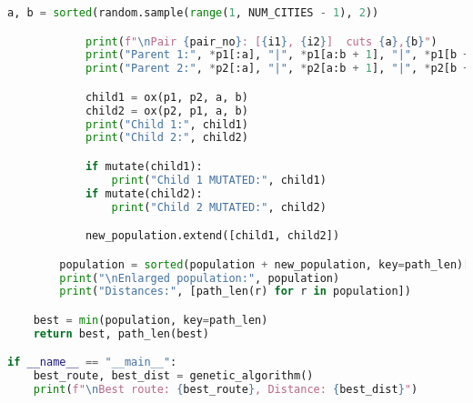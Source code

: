 \documentclass[a4paper,12pt]{article}
\begin{document}
\begin{lstlisting}[language=Python]
            a, b = sorted(random.sample(range(1, NUM_CITIES - 1), 2))

            print(f"\nPair {pair_no}: [{i1}, {i2}]  cuts {a},{b}")
            print("Parent 1:", *p1[:a], "|", *p1[a:b + 1], "|", *p1[b + 1:])
            print("Parent 2:", *p2[:a], "|", *p2[a:b + 1], "|", *p2[b + 1:])

            child1 = ox(p1, p2, a, b)
            child2 = ox(p2, p1, a, b)
            print("Child 1:", child1)
            print("Child 2:", child2)

            if mutate(child1):
                print("Child 1 MUTATED:", child1)
            if mutate(child2):
                print("Child 2 MUTATED:", child2)

            new_population.extend([child1, child2])

        population = sorted(population + new_population, key=path_len)[:POP_SIZE]
        print("\nEnlarged population:", population)
        print("Distances:", [path_len(r) for r in population])

    best = min(population, key=path_len)
    return best, path_len(best)

if __name__ == "__main__":
    best_route, best_dist = genetic_algorithm()
    print(f"\nBest route: {best_route}, Distance: {best_dist}")
\end{lstlisting}
\end{document}
